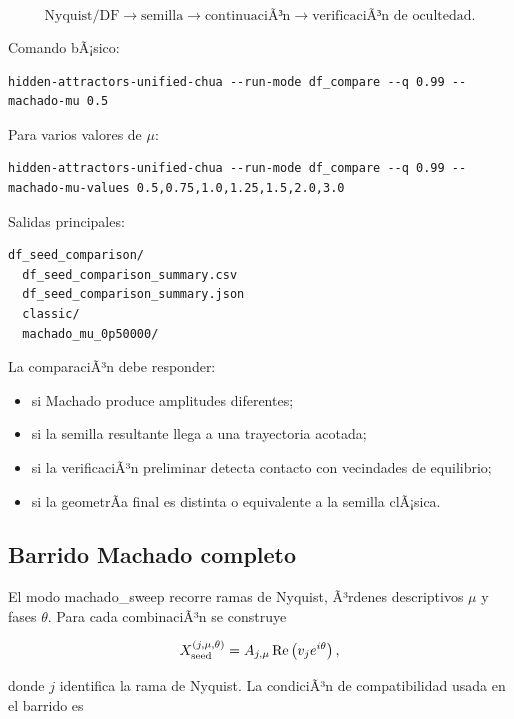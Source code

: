 \documentclass[11pt]{article}
\DeclareRobustCommand{\codepath}[1]{\begingroup\Urlmuskip=0mu plus 2mu\path{#1}\endgroup}
\def\codepath#1{#1}%
\begin{document}
\begin{equation}
\text{Nyquist/DF}\rightarrow \text{semilla}\rightarrow \text{continuaciÃ³n}\rightarrow \text{verificaciÃ³n de ocultedad}.
\end{equation}

Comando bÃ¡sico:

\begin{lstlisting}
hidden-attractors-unified-chua --run-mode df_compare --q 0.99 --machado-mu 0.5
\end{lstlisting}

Para varios valores de \(\mu\):

\begin{lstlisting}
hidden-attractors-unified-chua --run-mode df_compare --q 0.99 --machado-mu-values 0.5,0.75,1.0,1.25,1.5,2.0,3.0
\end{lstlisting}

Salidas principales:

\begin{lstlisting}
df_seed_comparison/
  df_seed_comparison_summary.csv
  df_seed_comparison_summary.json
  classic/
  machado_mu_0p50000/
\end{lstlisting}

La comparaciÃ³n debe responder:
\begin{itemize}
\item si Machado produce amplitudes diferentes;
\item si la semilla resultante llega a una trayectoria acotada;
\item si la verificaciÃ³n preliminar detecta contacto con vecindades de equilibrio;
\item si la geometrÃ­a final es distinta o equivalente a la semilla clÃ¡sica.
\end{itemize}

\subsection{Barrido Machado completo}

El modo \codepath{machado_sweep} recorre ramas de Nyquist, Ã³rdenes descriptivos \(\mu\) y fases \(\theta\). Para cada combinaciÃ³n se construye

\begin{equation}
X_{\rm seed}^{(j,\mu,\theta)}
=
A_{j,\mu}\operatorname{Re}\left(v_j e^{i\theta}\right),
\end{equation}

donde \(j\) identifica la rama de Nyquist. La condiciÃ³n de compatibilidad usada en el barrido es
\end{document}
